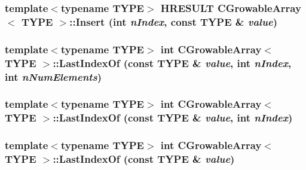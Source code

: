 \label{class_c_growable_array_a25e5e002fc8960491e350861d690c76b}
\hypertarget{class_c_growable_array_a163c27cde9aff49764ef63c4a784ffce}{
\subsubsection[{Insert}]{\setlength{\rightskip}{0pt plus 5cm}template$<$typename TYPE$>$ HRESULT {\bf CGrowableArray}$<$ TYPE $>$::Insert ({\bf int} {\em nIndex}, \/  const TYPE \& {\em value})}}
\label{class_c_growable_array_a163c27cde9aff49764ef63c4a784ffce}
\hypertarget{class_c_growable_array_a117caee552de4bae643d0e059266a8d2}{
\subsubsection[{LastIndexOf}]{\setlength{\rightskip}{0pt plus 5cm}template$<$typename TYPE$>$ {\bf int} {\bf CGrowableArray}$<$ TYPE $>$::LastIndexOf (const TYPE \& {\em value}, \/  {\bf int} {\em nIndex}, \/  {\bf int} {\em nNumElements})}}
\label{class_c_growable_array_a117caee552de4bae643d0e059266a8d2}
\hypertarget{class_c_growable_array_a36b8cf1c09ad2672174e9943d60f7d47}{
\subsubsection[{LastIndexOf}]{\setlength{\rightskip}{0pt plus 5cm}template$<$typename TYPE$>$ {\bf int} {\bf CGrowableArray}$<$ TYPE $>$::LastIndexOf (const TYPE \& {\em value}, \/  {\bf int} {\em nIndex})}}
\label{class_c_growable_array_a36b8cf1c09ad2672174e9943d60f7d47}
\hypertarget{class_c_growable_array_aaff681306d8ac4a490d7bca720f2a51a}{
\subsubsection[{LastIndexOf}]{\setlength{\rightskip}{0pt plus 5cm}template$<$typename TYPE$>$ {\bf int} {\bf CGrowableArray}$<$ TYPE $>$::LastIndexOf (const TYPE \& {\em value})}}

